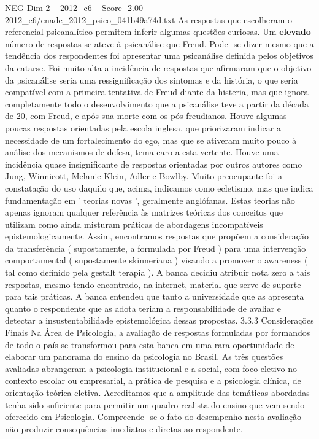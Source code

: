 \begin{textsample}{NEG Dim 2 – 2012\_c6 – Score -2.00 – 2012\_c6/enade\_2012\_psico\_041b49a74d.txt}
As respostas que escolheram o referencial psicanalítico permitem inferir algumas questões curiosas.
Um \textbf{elevado} número de respostas se ateve à psicanálise que Freud.
Pode -se dizer mesmo que a tendência dos respondentes foi apresentar uma psicanálise definida pelos objetivos da catarse.
Foi muito alta a incidência de respostas que afirmaram que o objetivo da psicanálise seria uma ressignificação dos sintomas e da história, o que seria compatível com a primeira tentativa de Freud diante da histeria, mas que ignora completamente todo o desenvolvimento que a psicanálise teve a partir da década de 20, com Freud, e após sua morte com os pós-freudianos.
Houve algumas poucas respostas orientadas pela escola inglesa, que priorizaram indicar a necessidade de um fortalecimento do ego, mas que se ativeram muito pouco à análise dos mecanismos de defesa, tema caro a esta vertente.
Houve uma incidência quase insignificante de respostas orientadas por outros autores como Jung, Winnicott, Melanie Klein, Adler e Bowlby.
Muito preocupante foi a constatação do uso daquilo que, acima, indicamos como ecletismo, mas que indica fundamentação em ' teorias novas ', geralmente anglófanas.
Estas teorias não apenas ignoram qualquer referência às matrizes teóricas dos conceitos que utilizam como ainda misturam práticas de abordagens incompatíveis epistemologicamente.
Assim, encontramos respostas que propõem a consideração da transferência ( supostamente, a formulada por Freud ) para uma intervenção comportamental ( supostamente skinneriana ) visando a promover o awareness ( tal como definido pela gestalt terapia ).
A banca decidiu atribuir nota zero a tais respostas, mesmo tendo encontrado, na internet, material que serve de suporte para tais práticas.
A banca entendeu que tanto a universidade que as apresenta quanto o respondente que as adota teriam a responsabilidade de avaliar e detectar a insustentabilidade epistemológica dessas propostas. 3.3.3 Considerações Finais Na Área de Psicologia, a avaliação de respostas formuladas por formandos de todo o país se transformou para esta banca em uma rara oportunidade de elaborar um panorama do ensino da psicologia no Brasil.
As três questões avaliadas abrangeram a psicologia institucional e a social, com foco eletivo no contexto escolar ou empresarial, a prática de pesquisa e a psicologia clínica, de orientação teórica eletiva.
Acreditamos que a amplitude das temáticas abordadas tenha sido suficiente para permitir um quadro realista do ensino que vem sendo oferecido em Psicologia.
Compreende -se o fato do desempenho nesta avaliação não produzir consequências imediatas e diretas ao respondente.

\end{textsample}
